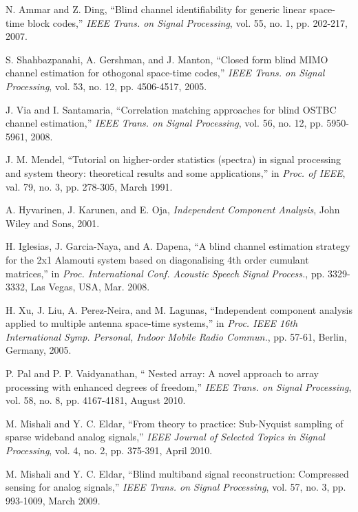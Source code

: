 \documentclass[letterpaper,10pt]{article}
\begin{document}
\begin{thebibliography}{1}
   N. Ammar and Z. Ding, ``Blind channel identifiability for generic linear space-time block codes,'' \emph{IEEE Trans. on Signal Processing}, vol. 55, no. 1, pp. 202-217, 2007.

   S. Shahbazpanahi, A. Gershman, and J. Manton, ``Closed form blind MIMO channel estimation for othogonal space-time codes,'' \emph{IEEE Trans. on Signal Processing}, vol. 53, no. 12, pp. 4506-4517, 2005.

   J. Via and I. Santamaria, ``Correlation matching approaches for blind OSTBC channel estimation,'' \emph{IEEE Trans. on Signal Processing}, vol. 56, no. 12, pp. 5950-5961, 2008.

   J. M. Mendel, ``Tutorial on higher-order statistics (spectra) in signal processing and system theory: theoretical results and some applications,'' in \emph{Proc. of IEEE}, val. 79, no. 3, pp. 278-305, March 1991.

   A. Hyvarinen, J. Karunen, and E. Oja, \emph{Independent Component Analysis}, John Wiley and Sons, 2001.

   H. Iglesias, J. Garcia-Naya, and A. Dapena, ``A blind channel estimation strategy for the 2x1 Alamouti system based on diagonalising 4th order cumulant matrices,'' in \emph{Proc. International Conf. Acoustic Speech Signal Process.}, pp. 3329-3332, Las Vegas, USA, Mar. 2008.

    H. Xu, J. Liu, A. Perez-Neira, and M. Lagunas, ``Independent component analysis applied to multiple antenna space-time systems,'' in \emph{Proc. IEEE 16th International Symp. Personal, Indoor Mobile Radio Commun.}, pp. 57-61, Berlin, Germany, 2005.

   P. Pal and P. P. Vaidyanathan, `` Nested array: A novel approach to array processing with enhanced degrees of freedom,'' \emph{IEEE Trans. on Signal Processing}, vol. 58, no. 8, pp. 4167-4181, August 2010.

   M. Mishali and Y. C. Eldar, ``From theory to practice: Sub-Nyquist sampling of sparse wideband analog signals,'' \emph{IEEE Journal of Selected Topics in Signal Processing}, vol. 4, no. 2, pp. 375-391, April 2010.

   M. Mishali and Y. C. Eldar, ``Blind multiband signal reconstruction: Compressed sensing for analog signals,'' \emph{IEEE Trans. on Signal Processing}, vol. 57, no. 3, pp. 993-1009, March 2009.


\end{thebibliography}
\end{document}
